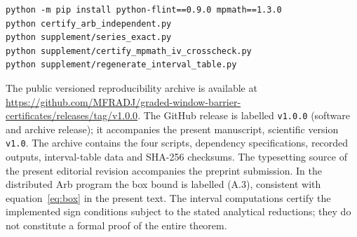\documentclass[10pt,a4paper]{article}
\numberwithin{equation}{section}
\theoremstyle{remark}\newtheorem{remark}[theorem]{Remark}\newtheorem{question}[theorem]{Question}
\begin{document}
\begin{verbatim}
python -m pip install python-flint==0.9.0 mpmath==1.3.0
python certify_arb_independent.py
python supplement/series_exact.py
python supplement/certify_mpmath_iv_crosscheck.py
python supplement/regenerate_interval_table.py
\end{verbatim}
The public versioned reproducibility archive is available at
\url{https://github.com/MFRADJ/graded-window-barrier-certificates/releases/tag/v1.0.0}.
The GitHub release is labelled \texttt{v1.0.0} (software and archive release);
it accompanies the present manuscript, scientific version \texttt{v1.0}.
The archive contains the four scripts, dependency specifications, recorded
outputs, interval-table data and SHA-256 checksums. The typesetting source of
the present editorial revision accompanies the preprint submission.
In the distributed Arb program the box bound is labelled (A.3), consistent
with equation~\eqref{eq:box} in the present text. The interval computations
certify the implemented sign conditions subject to the stated analytical
reductions; they do not constitute a formal proof of the entire theorem.
\end{document}
